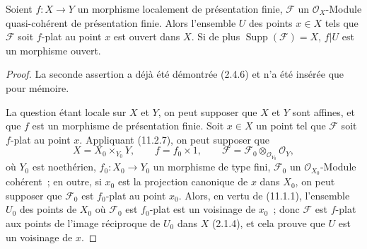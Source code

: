 \begin{theorem}[11.3.1]
\label{IV.11.3.1-fr}
Soient $f:X\to Y$ un morphisme localement de présentation finie,
$\mathcal F$ un $\mathcal O_X$-Module quasi-cohérent de présentation finie.
Alors l'ensemble $U$ des points $x\in X$ tels que $\mathcal F$ soit $f$-plat
au point $x$ est ouvert dans $X$. Si de plus $\operatorname{Supp}(\mathcal F)=X$,
$f|U$ est un morphisme ouvert.
\end{theorem}

\begin{proof}
La seconde assertion a déjà été démontrée (2.4.6) et n'a été insérée que pour
mémoire.

La question étant locale sur $X$ et $Y$, on peut supposer que $X$ et $Y$ sont
affines, et que $f$ est un morphisme de présentation finie. Soit $x\in X$ un
point tel que $\mathcal F$ soit $f$-plat au point $x$. Appliquant (11.2.7), on
peut supposer que
\[
X=X_0\times_{Y_0}Y,\qquad f=f_0\times1,\qquad
\mathcal F=\mathcal F_0\otimes_{\mathcal O_{Y_0}}\mathcal O_Y,
\]
où $Y_0$ est noethérien, $f_0:X_0\to Y_0$ un morphisme de type fini,
$\mathcal F_0$ un $\mathcal O_{X_0}$-Module cohérent~; en outre, si $x_0$ est la
projection canonique de $x$ dans $X_0$, on peut supposer que $\mathcal F_0$ est
$f_0$-plat au point $x_0$. Alors, en vertu de (11.1.1), l'ensemble $U_0$ des
points de $X_0$ où $\mathcal F_0$ est $f_0$-plat est un voisinage de $x_0$~;
donc $\mathcal F$ est $f$-plat aux points de l'image réciproque de $U_0$ dans
$X$ (2.1.4), et cela prouve que $U$ est un voisinage de $x$.
\end{proof}

